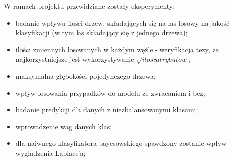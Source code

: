 W ramach projektu przewidziane zostały eksperymenty:
\begin{itemize}
    \item badanie wpływu ilości drzew, składających się na las losowy na jakość klasyfikacji (w tym las składający się z jednego drzewa);
    \item ilości zmiennych losowanych w każdym węźle - weryfikacja tezy, że najkorzystniejsze jest wykorzystywanie $\sqrt {ilosc atrybutow}$;
    \item maksymalna głębokości pojedynczego drzewa;
    \item wpływ losowania przypadków do modelu ze zwracaniem i bez;
    \item badanie predykcji dla danych z niezbalansowanymi klasami;
        \item wprowadzenie wag danych klas;
        \item dla naiwnego klasyfikatora bayesowskiego spawdzony zostanie wpływ wygladzenia Laplace'a;
        
\end{itemize}
